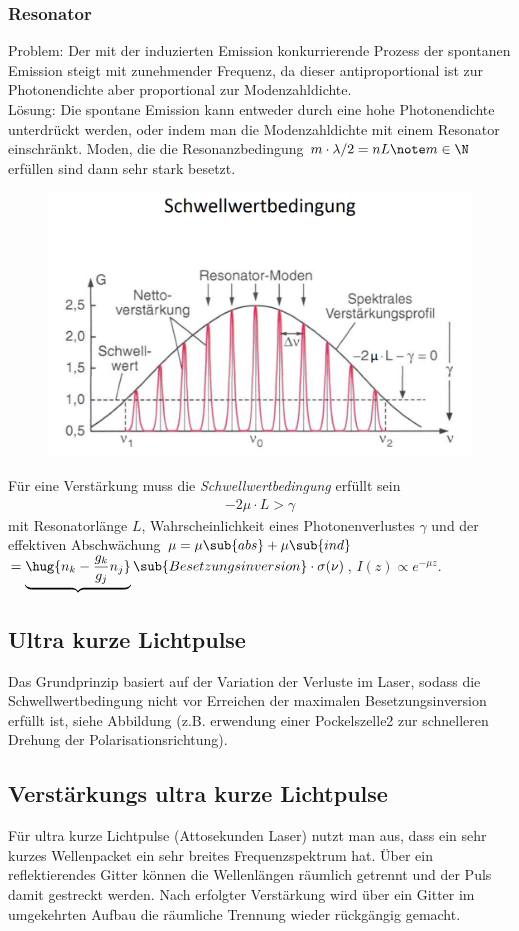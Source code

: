 \documentclass[twocolumn]{summery_4.1}
\begin{document}
\subsubsection{Resonator}
Problem: Der mit der induzierten Emission konkurrierende Prozess der spontanen Emission steigt mit zunehmender Frequenz, da dieser antiproportional ist zur Photonendichte aber proportional zur Modenzahldichte.\\

Lösung: Die spontane Emission kann entweder durch eine hohe Photonendichte unterdrückt werden, oder indem man die Modenzahldichte mit einem Resonator einschränkt. Moden, die die Resonanzbedingung \(m\cdot \lambda/2 = n L\note m\in\N \) erfüllen sind dann sehr stark besetzt.

\begin{figure}[H]
    \centering
    \includegraphics[width=.49\textwidth]{Schwellwertbedingung.png}
\end{figure}

Für eine Verstärkung muss die \emph{Schwellwertbedingung} erfüllt sein 
\begin{align*}
    -2\mu \cdot L > \gamma 
\end{align*}
mit Resonatorlänge \(L\), Wahrscheinlichkeit eines Photonenverlustes \(\gamma\) und der effektiven Abschwächung \(\mu = \mu\sub{abs}+\mu\sub{ind}\)
\(= \underbrace{\hug{n_k - \frac{g_k}{g_j}n_j}}\sub{Besetzungsinversion}\cdot \sigma(\nu)\), \(I(z)\propto e^{-\mu z}\).

\subsection{Ultra kurze Lichtpulse}
Das Grundprinzip basiert auf der Variation der Verluste im Laser, sodass die Schwellwertbedingung
nicht vor Erreichen der maximalen Besetzungsinversion erfüllt ist, siehe Abbildung (z.B. erwendung einer Pockelszelle2 zur schnelleren Drehung der Polarisationsrichtung).

\subsection{Verstärkungs ultra kurze Lichtpulse}
Für ultra kurze Lichtpulse (Attosekunden Laser) nutzt man aus, dass ein sehr kurzes Wellenpacket ein sehr breites Frequenzspektrum hat. Über ein reflektierendes Gitter können die Wellenlängen räumlich getrennt und der
Puls damit gestreckt werden. Nach erfolgter Verstärkung wird über ein Gitter im umgekehrten Aufbau die räumliche Trennung wieder rückgängig gemacht.
\end{document}
